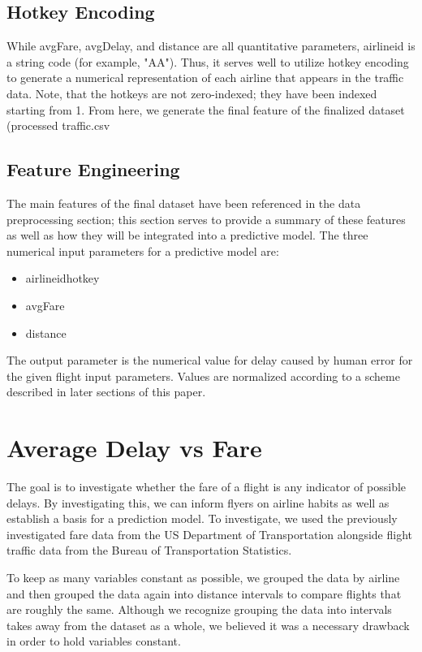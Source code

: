 \documentclass{article}
\begin{document}
\subsection{Hotkey Encoding}
While avgFare, avgDelay, and distance are all quantitative parameters, airline\textunderscore id is a string code (for example, "AA"). Thus, it serves well to utilize hotkey encoding to generate a numerical representation of each airline that appears in the traffic data. Note, that the hotkeys are not zero-indexed; they have been indexed starting from 1. From here, we generate the final feature of the finalized dataset (processed \textunderscore traffic.csv

\subsection{Feature Engineering}

The main features of the final dataset have been referenced in the data preprocessing section; this section serves to provide a summary of these features as well as how they will be integrated into a  predictive model. The three numerical input parameters for a predictive model are:

\begin{itemize}
  \item airline\textunderscore id\textunderscore hotkey
  \item avgFare
  \item distance
\end{itemize}

The output parameter is the numerical value for delay caused by human error for the given flight input parameters. Values are normalized according to a scheme described in later sections of this paper. 
\section{Average Delay vs Fare}
The goal is to investigate whether the fare of a flight is any indicator of possible delays. By investigating this, we can inform flyers on airline habits as well as establish a basis for a prediction model. To investigate, we used the previously investigated fare data from the US Department of Transportation alongside flight traffic data from the Bureau of Transportation Statistics. 

To keep as many variables constant as possible, we grouped the data by airline and then grouped the data again into distance intervals to compare flights that are roughly the same. Although we recognize grouping the data into intervals takes away from the dataset as a whole, we believed it was a necessary drawback in order to hold variables constant. 
\end{document}
